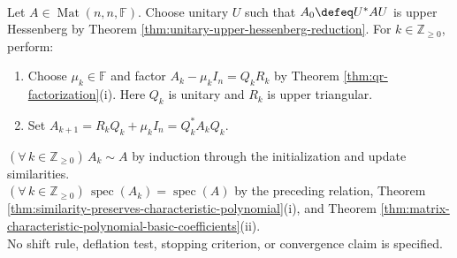 \begin{computationmethod} \label{meth:qr-eigenvalue-algorithm-preview} \\
Let $A\in\operatorname{Mat}(n,n,\mathbb{F})$. Choose unitary $U$ such that $A_0\defeq U^*AU$ is upper Hessenberg by Theorem \ref{thm:unitary-upper-hessenberg-reduction}. For $k\in\mathbb{Z}_{\geq0}$, perform:
\begin{enumerate}[label=(\roman*)]
\setlength{\itemsep}{0pt}
\item Choose $\mu_k\in\mathbb{F}$ and factor $A_k-\mu_kI_n=Q_kR_k$ by Theorem \ref{thm:qr-factorization}(i). Here $Q_k$ is unitary and $R_k$ is upper triangular.
\item Set $A_{k+1}=R_kQ_k+\mu_kI_n=Q_k^*A_kQ_k$.
\end{enumerate}
$(\forall\,k\in\mathbb{Z}_{\geq0})\,A_k\sim A$ by induction through the initialization and update similarities.\\
$(\forall\,k\in\mathbb{Z}_{\geq0})\,\operatorname{spec}(A_k)=\operatorname{spec}(A)$ by the preceding relation, Theorem \ref{thm:similarity-preserves-characteristic-polynomial}(i), and Theorem \ref{thm:matrix-characteristic-polynomial-basic-coefficients}(ii).\\
No shift rule, deflation test, stopping criterion, or convergence claim is specified.
\end{computationmethod}

